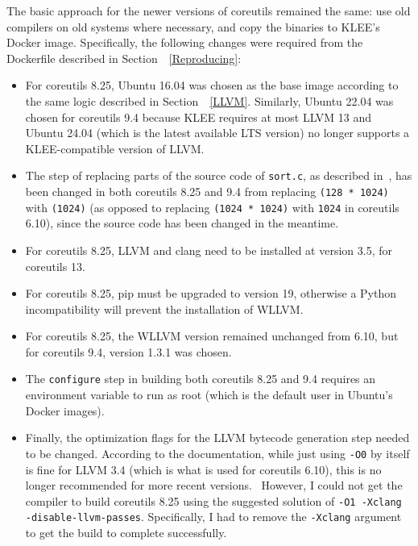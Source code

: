 \documentclass{article}
\let\savedCite=\cite
\renewcommand{\cite}{\unskip~\savedCite}
\let\savedRef=\ref
\renewcommand{\ref}{\unskip~\savedRef}
\begin{document}
The basic approach for the newer versions of coreutils remained the same: use old compilers on old systems where necessary, and copy the binaries to KLEE's Docker image. Specifically, the following changes were required from the Dockerfile described in Section~\ref{Reproducing}:
\begin{itemize}
    \item For coreutils 8.25, Ubuntu 16.04 was chosen as the base image according to the same logic described in Section~\ref{LLVM}. Similarly, Ubuntu 22.04 was chosen for coreutils 9.4 because KLEE requires at most LLVM 13 and Ubuntu 24.04 (which is the latest available LTS version) no longer supports a KLEE-compatible version of LLVM.
    \item The step of replacing parts of the source code of \lstinline{sort.c}, as described in\cite{KLEEFAQ}, has been changed in both coreutils 8.25 and 9.4 from replacing \lstinline{(128 * 1024)} with \lstinline{(1024)} (as opposed to replacing \lstinline{(1024 * 1024)} with \lstinline{1024} in coreutils 6.10), since the source code has been changed in the meantime.
    \item For coreutils 8.25, LLVM and clang need to be installed at version 3.5, for coreutils 13.
    \item For coreutils 8.25, pip must be upgraded to version 19, otherwise a Python incompatibility will prevent the installation of WLLVM.
    \item For coreutils 8.25, the WLLVM version remained unchanged from 6.10, but for coreutils 9.4, version 1.3.1 was chosen.
    \item The \lstinline{configure} step in building both coreutils 8.25 and 9.4 requires an environment variable to run as root (which is the default user in Ubuntu's Docker images).
    \item Finally, the optimization flags for the LLVM bytecode generation step needed to be changed. According to the documentation, while just using \lstinline{-O0} by itself is fine for LLVM 3.4 (which is what is used for coreutils 6.10), this is no longer recommended for more recent versions.\cite{KLEETutorial, KLEEIssue} However, I could not get the compiler to build coreutils 8.25 using the suggested solution of \lstinline{-O1 -Xclang -disable-llvm-passes}. Specifically, I had to remove the \lstinline{-Xclang} argument to get the build to complete successfully.
\end{itemize}
\end{document}
